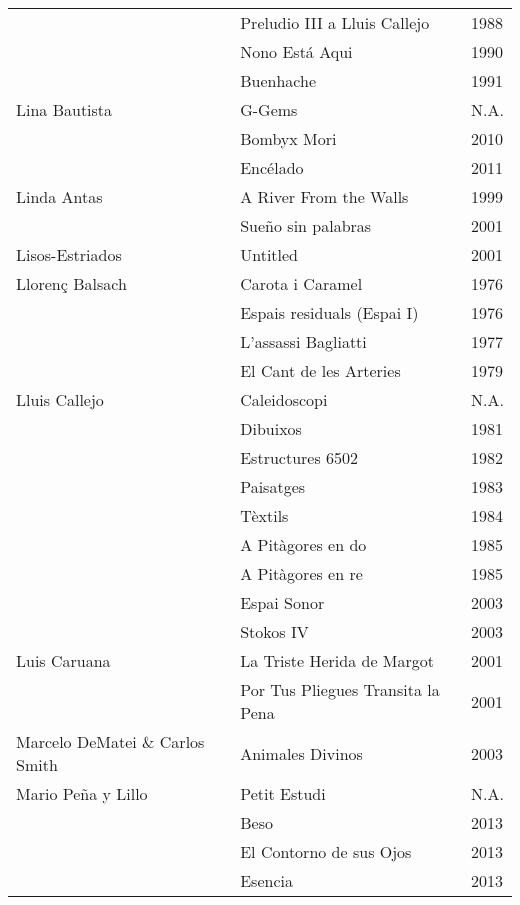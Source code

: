\begin{center}
\begin{longtable}{ p{}  p{}  p{} }
& Preludio III a Lluis Callejo & 1988 \\ \cmidrule (r){2-3} 
& Nono Está Aqui & 1990 \\ \cmidrule (r){2-3} 
& Buenhache & 1991 \\ \midrule 
Lina Bautista & G-Gems & N.A.\\ \cmidrule (r){2-3} 
& Bombyx Mori & 2010 \\ \cmidrule (r){2-3} 
& Encélado & 2011 \\ \midrule 
Linda Antas & A River From the Walls & 1999 \\ \cmidrule (r){2-3} 
& Sueño sin palabras & 2001 \\ \midrule 
Lisos-Estriados & Untitled & 2001 \\ \midrule 
Llorenç Balsach & Carota i Caramel & 1976 \\ \cmidrule (r){2-3} 
& Espais residuals (Espai I) & 1976 \\ \cmidrule (r){2-3} 
& L'assassi Bagliatti & 1977 \\ \cmidrule (r){2-3}  
& El Cant de les Arteries & 1979 \\ \midrule 
Lluis Callejo & Caleidoscopi & N.A. \\ \cmidrule (r){2-3} 
& Dibuixos & 1981 \\ \cmidrule (r){2-3} 
& Estructures 6502 & 1982 \\ \cmidrule (r){2-3} 
& Paisatges & 1983 \\ \cmidrule (r){2-3} 
& Tèxtils & 1984 \\ \cmidrule (r){2-3} 
& A Pitàgores en do & 1985 \\ \cmidrule (r){2-3} 
& A Pitàgores en re & 1985 \\ \cmidrule (r){2-3} 
& Espai Sonor & 2003 \\ \cmidrule (r){2-3} 
& Stokos IV & 2003 \\ \midrule 
Luis Caruana & La Triste Herida de Margot & 2001 \\ \cmidrule (r){2-3} 
& Por Tus Pliegues Transita la Pena & 2001 \\ \midrule 
Marcelo DeMatei \& Carlos Smith & Animales Divinos & 2003 \\ \midrule 
Mario Peña y Lillo & Petit Estudi & N.A. \\ \cmidrule (r){2-3} 
& Beso & 2013 \\ \cmidrule (r){2-3} 
& El Contorno de sus Ojos & 2013 \\ \cmidrule (r){2-3} 
& Esencia & 2013 \\ \cmidrule (r){2-3} 

\end{longtable}
\end{center}
